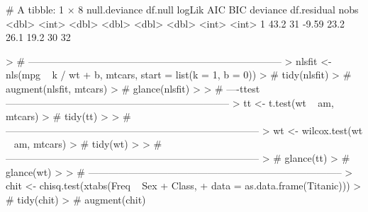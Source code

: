 \documentclass{article}
\begin{document}
\begin{Schunk}
\begin{Soutput}
# A tibble: 1 × 8
  null.deviance df.null logLik   AIC   BIC deviance df.residual  nobs
          <dbl>   <int>  <dbl> <dbl> <dbl>    <dbl>       <int> <int>
1          43.2      31  -9.59  23.2  26.1     19.2          30    32
\end{Soutput}
\begin{Sinput}
> # -----------------------------------------------------------------------------
> nlsfit <- nls(mpg ~ k / wt + b, mtcars, start = list(k = 1, b = 0))
> # tidy(nlsfit)
> # augment(nlsfit, mtcars)
> # glance(nlsfit)
> 
> # ----ttest--------------------------------------------------------------------
> tt <- t.test(wt ~ am, mtcars)
> # tidy(tt)
> 
> # -----------------------------------------------------------------------------
> wt <- wilcox.test(wt ~ am, mtcars)
> # tidy(wt)
> 
> # -----------------------------------------------------------------------------
> # glance(tt)
> # glance(wt)
> 
> # -----------------------------------------------------------------------------
> chit <- chisq.test(xtabs(Freq ~ Sex + Class, 
+                          data = as.data.frame(Titanic)))
> # tidy(chit)
> # augment(chit)
\end{Sinput}
\end{Schunk}
\end{document}
